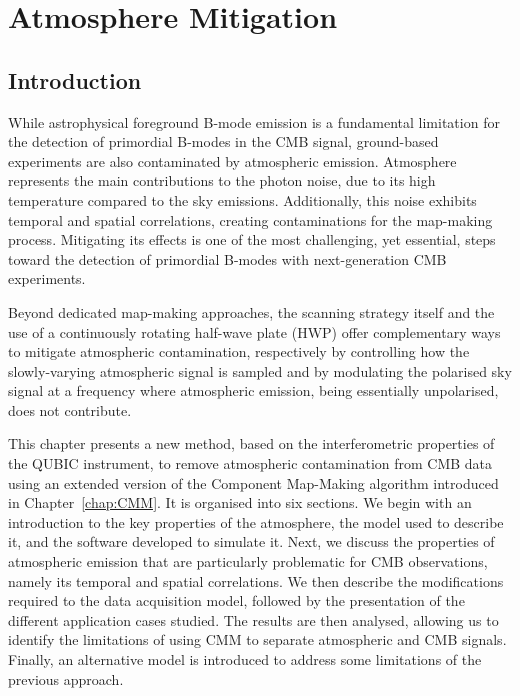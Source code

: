 \documentclass[../../thesis.tex]{subfiles}
\begin{document}
\chapter{Atmosphere Mitigation} \label{chap:atm}

\ifSubfilesClassLoaded{
    \tableofcontents
}{
    \minitoc
}

\section*{Introduction}

While astrophysical foreground B-mode emission is a fundamental limitation for the detection of primordial B-modes in the CMB signal, ground-based experiments are also contaminated by atmospheric emission. Atmosphere represents the main contributions to the photon noise, due to its high temperature compared to the sky emissions. Additionally, this noise exhibits temporal and spatial correlations, creating contaminations for the map-making process. Mitigating its effects is one of the most challenging, yet essential, steps toward the detection of primordial B-modes with next-generation CMB experiments.

Beyond dedicated map-making approaches, the scanning strategy itself and the use of a continuously rotating half-wave plate (HWP) offer complementary ways to mitigate atmospheric contamination, respectively by controlling how the slowly-varying atmospheric signal is sampled and by modulating the polarised sky signal at a frequency where atmospheric emission, being essentially unpolarised, does not contribute.

This chapter presents a new method, based on the interferometric properties of the QUBIC instrument, to remove atmospheric contamination from CMB data using an extended version of the Component Map-Making algorithm introduced in Chapter~\ref{chap:CMM}. It is organised into six sections. We begin with an introduction to the key properties of the atmosphere, the model used to describe it, and the software developed to simulate it. Next, we discuss the properties of atmospheric emission that are particularly problematic for CMB observations, namely its temporal and spatial correlations. We then describe the modifications required to the data acquisition model, followed by the presentation of the different application cases studied. The results are then analysed, allowing us to identify the limitations of using CMM to separate atmospheric and CMB signals. Finally, an alternative model is introduced to address some limitations of the previous approach. \\
\end{document}
